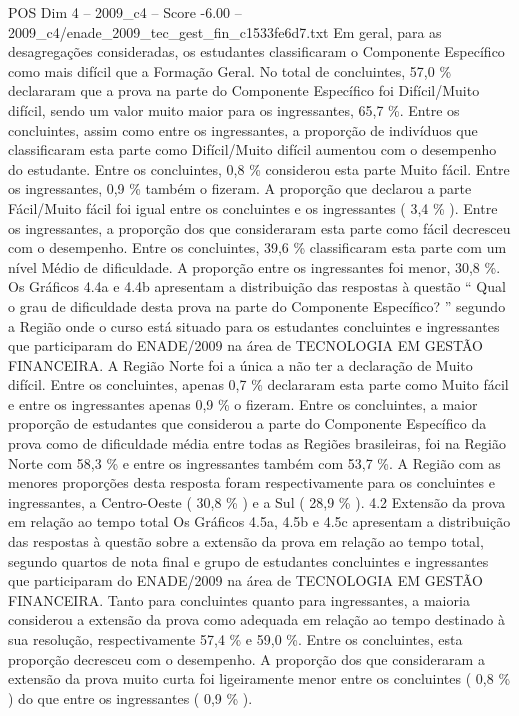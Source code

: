 \begin{textsample}{POS Dim 4 – 2009\_c4 – Score -6.00 – 2009\_c4/enade\_2009\_tec\_gest\_fin\_c1533fe6d7.txt}
Em geral, para as desagregações consideradas, os estudantes classificaram o Componente Específico como mais difícil que a Formação Geral.
No total de concluintes, 57,0 \% declararam que a prova na parte do Componente Específico foi Difícil/Muito difícil, sendo um valor muito maior para os ingressantes, 65,7 \%.
Entre os concluintes, assim como entre os ingressantes, a proporção de indivíduos que classificaram esta parte como Difícil/Muito difícil aumentou com o desempenho do estudante.
Entre os concluintes, 0,8 \% considerou esta parte Muito fácil.
Entre os ingressantes, 0,9 \% também o fizeram.
A proporção que declarou a parte Fácil/Muito fácil foi igual entre os concluintes e os ingressantes ( 3,4 \% ).
Entre os ingressantes, a proporção dos que consideraram esta parte como fácil decresceu com o desempenho.
Entre os concluintes, 39,6 \% classificaram esta parte com um nível Médio de dificuldade.
A proporção entre os ingressantes foi menor, 30,8 \%.
Os Gráficos 4.4a e 4.4b apresentam a distribuição das respostas à questão “ Qual o grau de dificuldade desta prova na parte do Componente Específico? ” segundo a Região onde o curso está situado para os estudantes concluintes e ingressantes que participaram do ENADE/2009 na área de TECNOLOGIA EM GESTÃO FINANCEIRA.
A Região Norte foi a única a não ter a declaração de Muito difícil.
Entre os concluintes, apenas 0,7 \% declararam esta parte como Muito fácil e entre os ingressantes apenas 0,9 \% o fizeram.
Entre os concluintes, a maior proporção de estudantes que considerou a parte do Componente Específico da prova como de dificuldade média entre todas as Regiões brasileiras, foi na Região Norte com 58,3 \% e entre os ingressantes também com 53,7 \%.
A Região com as menores proporções desta resposta foram respectivamente para os concluintes e ingressantes, a Centro-Oeste ( 30,8 \% ) e a Sul ( 28,9 \% ). 4.2 Extensão da prova em relação ao tempo total Os Gráficos 4.5a, 4.5b e 4.5c apresentam a distribuição das respostas à questão sobre a extensão da prova em relação ao tempo total, segundo quartos de nota final e grupo de estudantes concluintes e ingressantes que participaram do ENADE/2009 na área de TECNOLOGIA EM GESTÃO FINANCEIRA.
Tanto para concluintes quanto para ingressantes, a maioria considerou a extensão da prova como adequada em relação ao tempo destinado à sua resolução, respectivamente 57,4 \% e 59,0 \%.
Entre os concluintes, esta proporção decresceu com o desempenho.
A proporção dos que consideraram a extensão da prova muito curta foi ligeiramente menor entre os concluintes ( 0,8 \% ) do que entre os ingressantes ( 0,9 \% ).

\end{textsample}
